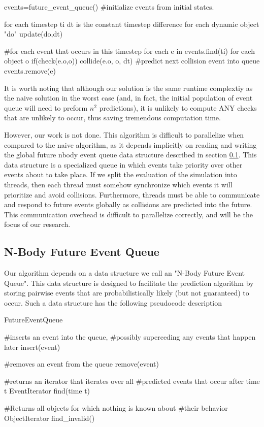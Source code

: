 \documentclass[conference]{IEEEtran}
\begin{document}
\begin{verbatimtab}[3]
events=future_event_queue()
#initialize events from initial states.

for each timestep ti
	dt is the constant timestep difference
	for each dynamic object "do"
		update(do,dt)

	#for each event that occurs in this timestep
	for each e in events.find(ti) 
		for each object o
			if(check(e.o,o))
				collide(e.o, o, dt)
				#predict next collision event into queue
		events.remove(e)
\end{verbatimtab}

It is worth noting that although our solution is the same runtime complextiy as the naive solution in the worst case (and, in fact, the initial population of event queue will need to preform $n^2$ predictions), it is unlikely to compute ANY checks that are unlikely to occur, thus saving tremendous computation time.  

However, our work is not done.  This algorithm is difficult to parallelize when compared to the naive algorithm, as it depends implicitly on reading and writing the global future nbody event queue data structure described in section \ref{sec:neq}.  This data structure is a specialized queue in which events take priority over other events about to take place. If we split the evaluation of the simulation into threads, then each thread must somehow synchronize which events it will prioritize and avoid collisions.  Furthermore, threads must be able to communicate and respond to future events  globally as collisions are predicted into the future.  This communication overhead is difficult to parallelize correctly, and will be the focus of our research.

\subsection{N-Body Future Event Queue}
\label{sec:neq}
Our algorithm depends on a data structure we call an "N-Body Future Event Queue".  This data structure is designed to facilitate the prediction algorithm
by storing pairwise events that are probabilistically likely (but not guaranteed) to occur.  Such a data structure has the following pseudocode description
\begin{verbatimtab}[3]
FutureEventQueue
{
	#inserts an event into the queue, 
	#possibly superceding any events that happen later
	insert(event)
	
	#removes an event from the queue
	remove(event)
	
	#returns an iterator that iterates over all
	#predicted events that occur after time t
	EventIterator find(time t)

        #Returns all objects for which nothing is known about 
        #their behavior
        ObjectIterator find_invalid()
}
\end{verbatimtab}
\end{document}
